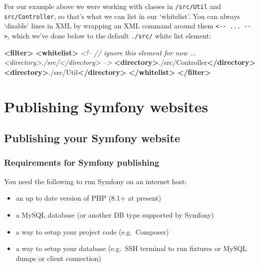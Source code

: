 \documentclass[a4paperpaper,openright]{book}
\newenvironment{Shaded}{}{}
\newcommand{\CommentTok}[1]{\textcolor[rgb]{0.38,0.63,0.69}{\textit{#1}}}
\newcommand{\KeywordTok}[1]{\textcolor[rgb]{0.00,0.44,0.13}{\textbf{#1}}}
\newcommand{\NormalTok}[1]{#1}
\begin{document}
For our example above we were working with classes in \texttt{/src/Util}
and \texttt{src/Controller}, so that's what we can list in our
`whitelist'. You can always `disable' lines in XML by wrapping an XML
command around them \texttt{\textless{}-\/-\ ...\ -\/-\textgreater{}},
which we've done below to the default \texttt{./src/} white list
element:

\begin{Shaded}
\begin{Highlighting}[]
    \KeywordTok{<filter>}
        \KeywordTok{<whitelist>}
            \CommentTok{<!--}
\CommentTok{                // ignore this element for now ...}
\CommentTok{                <directory>./src/</directory>}
\CommentTok{            -->}
            \KeywordTok{<directory>}\NormalTok{./src/Controller}\KeywordTok{</directory>}
            \KeywordTok{<directory>}\NormalTok{./src/Util}\KeywordTok{</directory>}
        \KeywordTok{</whitelist>}
    \KeywordTok{</filter>}
\end{Highlighting}
\end{Shaded}

\part{Publishing Symfony websites}

\hypertarget{publishing-your-symfony-website}{%
\chapter{Publishing your Symfony
website}\label{publishing-your-symfony-website}}

\hypertarget{requirements-for-symfony-publishing}{%
\section{Requirements for Symfony
publishing}\label{requirements-for-symfony-publishing}}

You need the following to run Symfony on an internet host:

\begin{itemize}
\item
  an up to date version of PHP (8.1+ at present)
\item
  a MySQL database (or another DB type supported by Symfony)
\item
  a way to setup your project code (e.g.~Composer)
\item
  a way to setup your database (e.g.~SSH terminal to run fixtures or
  MySQL dumps or client connection)
\end{itemize}
\end{document}
